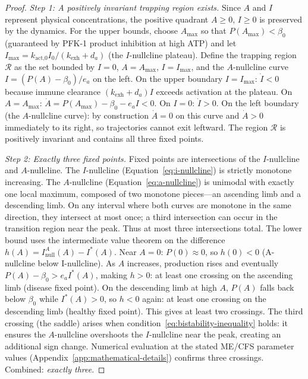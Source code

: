 \begin{proof}
\emph{Step 1: A positively invariant trapping region exists.} Since $A$ and $I$ represent physical concentrations, the positive quadrant $A \geq 0$, $I \geq 0$ is preserved by the dynamics. For the upper bounds, choose $A_{\max}$ so that $P(A_{\max}) < \beta_0$ (guaranteed by PFK-1 product inhibition at high ATP) and let $I_{\max} = k_{\text{act,0}} I_0 / (k_{\text{exh}} + d_a)$ (the $I$-nullcline plateau). Define the trapping region $\mathcal{R}$ as the set bounded by $I = 0$, $A = A_{\max}$, $I = I_{\max}$, and the $A$-nullcline curve $I = (P(A) - \beta_0)/e_a$ on the left. On the upper boundary $I = I_{\max}$: $\dot{I} < 0$ because immune clearance $(k_{\text{exh}} + d_a)I$ exceeds activation at the plateau. On $A = A_{\max}$: $\dot{A} = P(A_{\max}) - \beta_0 - e_a I < 0$. On $I = 0$: $\dot{I} > 0$. On the left boundary (the $A$-nullcline curve): by construction $\dot{A} = 0$ on this curve and $\dot{A} > 0$ immediately to its right, so trajectories cannot exit leftward. The region $\mathcal{R}$ is positively invariant and contains all three fixed points.

\emph{Step 2: Exactly three fixed points.} Fixed points are intersections of the $I$-nullcline and $A$-nullcline. The $I$-nullcline (Equation~\ref{eq:i-nullcline}) is strictly monotone increasing. The $A$-nullcline (Equation~\ref{eq:a-nullcline}) is unimodal with exactly one local maximum, composed of two monotone pieces---an ascending limb and a descending limb. On any interval where both curves are monotone in the same direction, they intersect at most once; a third intersection can occur in the transition region near the peak. Thus at most three intersections total. The lower bound uses the intermediate value theorem on the difference $h(A) = I_{\text{null}}^A(A) - I^*(A)$. Near $A = 0$: $P(0) \approx 0$, so $h(0) < 0$ (A-nullcline below I-nullcline). As $A$ increases, production rises and eventually $P(A) - \beta_0 > e_a I^*(A)$, making $h > 0$: at least one crossing on the ascending limb (disease fixed point). On the descending limb at high $A$, $P(A)$ falls back below $\beta_0$ while $I^*(A) > 0$, so $h < 0$ again: at least one crossing on the descending limb (healthy fixed point). This gives at least two crossings. The third crossing (the saddle) arises when condition~\ref{eq:bistability-inequality} holds: it ensures the $A$-nullcline overshoots the $I$-nullcline near the peak, creating an additional sign change. Numerical evaluation at the stated ME/CFS parameter values (Appendix~\ref{app:mathematical-details}) confirms three crossings. Combined: \emph{exactly three}.


\end{proof}
